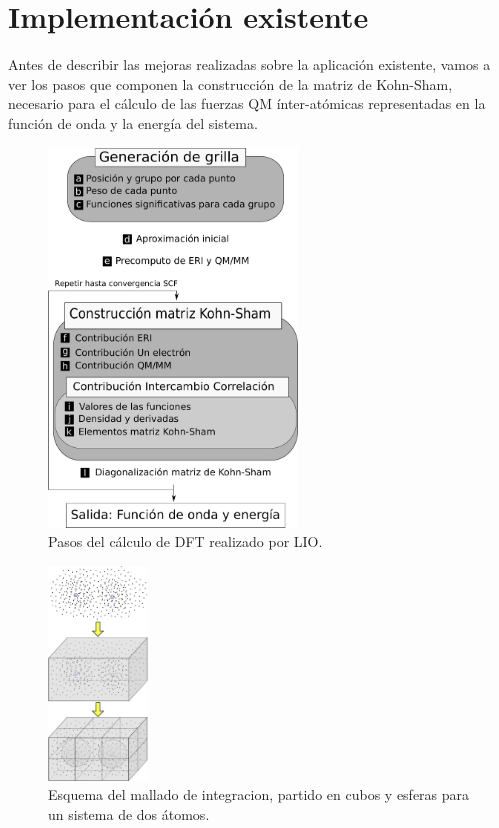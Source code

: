 \section{Implementaci\'on existente}
\label{implementacion}

Antes de describir las mejoras realizadas sobre la aplicaci\'on existente, vamos a ver
los pasos que componen la construcci\'on de la matriz de Kohn-Sham, necesario para el
c\'alculo de las fuerzas QM \'inter-at\'omicas representadas en la funci\'on de onda y
la energ\'ia del sistema.

\begin{figure}[htbp]
   \centering
   \includegraphics[width=250px]{images/g2g-steps.pdf}
   \caption{Pasos del c\'alculo de DFT realizado por LIO.}
   \label{fig:lio-steps}
\end{figure}

\begin{figure}[htbp]
   \centering
   \includegraphics[width=100px]{images/grilla.pdf}
   \caption{Esquema del mallado de integracion, partido en cubos y esferas para un sistema de dos \'atomos.}
   \label{fig:grilla}
\end{figure}

